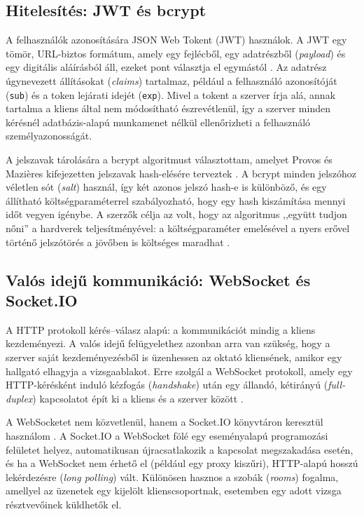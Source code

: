 \subsection{Hitelesítés: JWT és bcrypt}

A felhasználók azonosítására JSON Web Tokent (JWT) használok. A JWT egy tömör, URL-biztos
formátum, amely egy fejlécből, egy adatrészből (\textit{payload}) és egy digitális aláírásból áll,
ezeket pont választja el egymástól \cite{rfc7519}. Az adatrész úgynevezett állításokat
(\textit{claims}) tartalmaz, például a felhasználó azonosítóját (\texttt{sub}) és a token lejárati
idejét (\texttt{exp}). Mivel a tokent a szerver írja alá, annak tartalma a kliens által nem
módosítható észrevétlenül, így a szerver minden kérésnél adatbázis-alapú munkamenet nélkül
ellenőrizheti a felhasználó személyazonosságát.

A jelszavak tárolására a bcrypt algoritmust választottam, amelyet Provos és Mazières kifejezetten
jelszavak hash-elésére terveztek \cite{provos1999bcrypt}. A bcrypt minden jelszóhoz véletlen sót
(\textit{salt}) használ, így két azonos jelszó hash-e is különböző, és egy állítható
költségparaméterrel szabályozható, hogy egy hash kiszámítása mennyi időt vegyen igénybe. A
szerzők célja az volt, hogy az algoritmus ,,együtt tudjon nőni'' a hardverek teljesítményével:
a költségparaméter emelésével a nyers erővel történő jelszótörés a jövőben is költséges
maradhat \cite{provos1999bcrypt}.

\subsection{Valós idejű kommunikáció: WebSocket és Socket.IO}

A HTTP protokoll kérés--válasz alapú: a kommunikációt mindig a kliens kezdeményezi. A valós idejű
felügyelethez azonban arra van szükség, hogy a szerver saját kezdeményezésből is üzenhessen az
oktató kliensének, amikor egy hallgató elhagyja a vizsgaablakot. Erre szolgál a WebSocket
protokoll, amely egy HTTP-kérésként induló kézfogás (\textit{handshake}) után egy állandó,
kétirányú (\textit{full-duplex}) kapcsolatot épít ki a kliens és a szerver között \cite{rfc6455}.

A WebSocketet nem közvetlenül, hanem a Socket.IO könyvtáron keresztül használom
\cite{socketio_docs}. A Socket.IO a WebSocket fölé egy eseményalapú programozási felületet
helyez, automatikusan újracsatlakozik a kapcsolat megszakadása esetén, és ha a WebSocket nem
érhető el (például egy proxy kiszűri), HTTP-alapú hosszú lekérdezésre (\textit{long polling})
vált. Különösen hasznos a szobák (\textit{rooms}) fogalma, amellyel az üzenetek egy kijelölt
klienscsoportnak, esetemben egy adott vizsga résztvevőinek küldhetők el.

